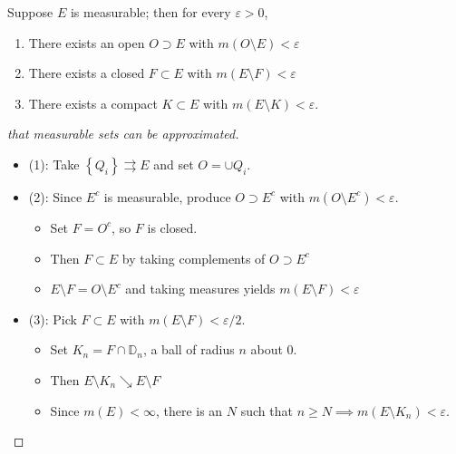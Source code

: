 \begin{theorem}

Suppose \(E\) is measurable; then for every \(\varepsilon>0\),

\begin{enumerate}
\def\labelenumi{\arabic{enumi}.}
\tightlist
\item
  There exists an open \(O\supset E\) with
  \(m(O\setminus E) < \varepsilon\)
\item
  There exists a closed \(F\subset E\) with
  \(m(E\setminus F) < \varepsilon\)
\item
  There exists a compact \(K\subset E\) with
  \(m(E\setminus K) < \varepsilon\).
\end{enumerate}

\end{theorem}

\begin{proof}[that measurable sets can be approximated]

\envlist

\begin{itemize}
\tightlist
\item
  (1): Take \(\left\{{Q_{i}}\right\} \rightrightarrows E\) and set
  \(O = \cup Q_{i}\).
\item
  (2): Since \(E^c\) is measurable, produce \(O\supset E^c\) with
  \(m(O\setminus E^c) < \varepsilon\).

  \begin{itemize}
  \tightlist
  \item
    Set \(F = O^c\), so \(F\) is closed.
  \item
    Then \(F\subset E\) by taking complements of \(O\supset E^c\)
  \item
    \(E\setminus F = O\setminus E^c\) and taking measures yields
    \(m(E\setminus F) < \varepsilon\)
  \end{itemize}
\item
  (3): Pick \(F\subset E\) with \(m(E\setminus F) < \varepsilon/2\).

  \begin{itemize}
  \tightlist
  \item
    Set \(K_{n} = F\cap{\mathbb{D}}_{n}\), a ball of radius \(n\) about
    \(0\).
  \item
    Then \(E\setminus K_{n} \searrow E\setminus F\)
  \item
    Since \(m(E) < \infty\), there is an \(N\) such that
    \(n\geq N \implies m(E\setminus K_{n}) < \varepsilon\).
  \end{itemize}
\end{itemize}

\end{proof}

